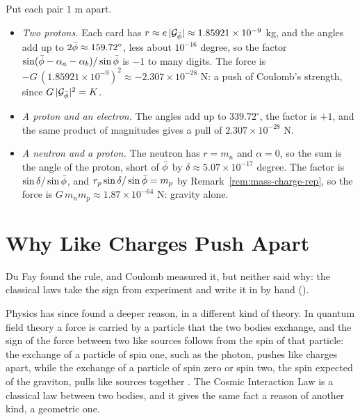 \begin{workedexample}
Put each pair $1$ m apart.
\begin{itemize}
  \item \emph{Two protons.} Each card has $r \approx e\,|\mathcal{G}_{\bar{\phi}}| \approx 1.85921 \times 10^{-9}$ kg, and the angles add up to $2\bar{\phi} \approx 159.72^\circ$, less about $10^{-16}$ degree, so the factor $\sin(\bar{\phi} - \alpha_a - \alpha_b)/\sin\bar{\phi}$ is $-1$ to many digits. The force is $-G\,(1.85921 \times 10^{-9})^2 \approx -2.307 \times 10^{-28}$ N: a push of Coulomb's strength, since $G\,|\mathcal{G}_{\bar{\phi}}|^2 = K$.
  \item \emph{A proton and an electron.} The angles add up to $339.72^\circ$, the factor is $+1$, and the same product of magnitudes gives a pull of $2.307 \times 10^{-28}$ N.
  \item \emph{A neutron and a proton.} The neutron has $r = m_n$ and $\alpha = 0$, so the sum is the angle of the proton, short of $\bar{\phi}$ by $\delta \approx 5.07 \times 10^{-17}$ degree. The factor is $\sin\delta/\sin\bar{\phi}$, and $r_p\sin\delta/\sin\bar{\phi} = m_p$ by Remark~\ref{rem:mass-charge-rep}, so the force is $G\,m_n m_p \approx 1.87 \times 10^{-64}$ N: gravity alone.
\end{itemize}
\end{workedexample}

\section{Why Like Charges Push Apart}\label{sec:why-mirror}

Du Fay found the rule, and Coulomb measured it, but neither said why: the classical laws take the sign from experiment and write it in by hand ().

Physics has since found a deeper reason, in a different kind of theory. In quantum field theory a force is carried by a particle that the two bodies exchange, and the sign of the force between two like sources follows from the spin of that particle: the exchange of a particle of spin one, such as the photon, pushes like charges apart, while the exchange of a particle of spin zero or spin two, the spin expected of the graviton, pulls like sources together \citep{Zee2010}. The Cosmic Interaction Law is a classical law between two bodies, and it gives the same fact a reason of another kind, a geometric one.

